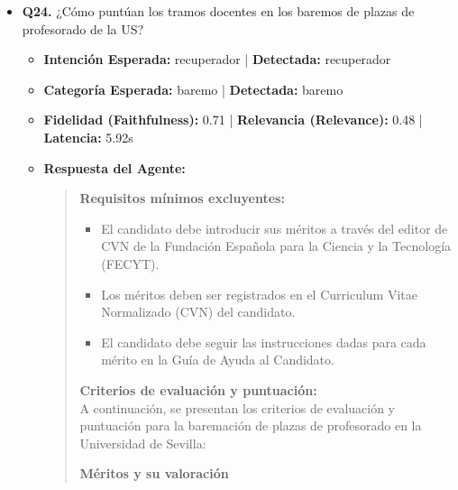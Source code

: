 \documentclass[12pt,a4paper,oneside]{report}
\begin{document}
\begin{itemize}
  
\item \textbf{Q24.} ¿Cómo puntúan los tramos docentes en los baremos de plazas de profesorado de la US? \\
        \begin{itemize}
          \item \textbf{Intención Esperada:} recuperador | \textbf{Detectada:} recuperador
          \item \textbf{Categoría Esperada:} baremo | \textbf{Detectada:} baremo
          \item \textbf{Fidelidad (Faithfulness):} 0.71 | \textbf{Relevancia (Relevance):} 0.48 | \textbf{Latencia:} 5.92s
          \item \textbf{{Respuesta del Agente:}} \\
                \begin{quote}

\noindent\textbf{Requisitos mínimos excluyentes:}\\

\begin{itemize}
  \item El candidato debe introducir sus méritos a través del editor de CVN de la Fundación Española para la Ciencia y la Tecnología (FECYT).
  \item Los méritos deben ser registrados en el Curriculum Vitae Normalizado (CVN) del candidato.
  \item El candidato debe seguir las instrucciones dadas para cada mérito en la Guía de Ayuda al Candidato.
\end{itemize}


\noindent\textbf{Criterios de evaluación y puntuación:}\\

A continuación, se presentan los criterios de evaluación y puntuación para la baremación de plazas de profesorado en la Universidad de Sevilla:


\noindent\textbf{Méritos y su valoración}\\



\end{quote}
\end{itemize}
\end{itemize}
\end{document}
